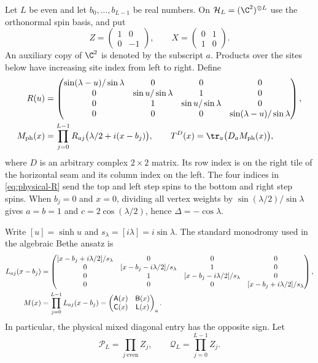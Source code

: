 Let $L$ be even and let $b_0,\ldots,b_{L-1}$ be real numbers.  On
$\mathcal H_L=(\C^2)^{\otimes L}$ use the orthonormal spin basis, and put
\[
 Z=\begin{pmatrix}1&0\\0&-1\end{pmatrix},\qquad
 X=\begin{pmatrix}0&1\\1&0\end{pmatrix}.
\]
An auxiliary copy of $\C^2$ is denoted by the subscript $a$.  Products
over the sites below have increasing site index from left to right.  Define
\begin{align}
 R(u)&=
 \begin{pmatrix}
 \sin(\lambda-u)/\sin\lambda&0&0&0\\
 0&\sin u/\sin\lambda&1&0\\
 0&1&\sin u/\sin\lambda&0\\
 0&0&0&\sin(\lambda-u)/\sin\lambda
 \end{pmatrix},\label{eq:physical-R}\\
 M_{\rm ph}(x)&=\prod_{j=0}^{L-1}
 R_{aj}\bigl(\lambda/2+i(x-b_j)\bigr),\qquad
 T^D(x)=\tr_a\bigl(D_aM_{\rm ph}(x)\bigr),\label{eq:physical-row}
\end{align}
where $D$ is an arbitrary complex $2\times2$ matrix.  Its row index is
on the right tile of the horizontal seam and its column index on the
left.  The four indices in \eqref{eq:physical-R} send the top and left
step spins to the bottom and right step spins.  When $b_j=0$ and $x=0$,
dividing all vertex weights by $\sin(\lambda/2)/\sin\lambda$ gives
$a=b=1$ and $c=2\cos(\lambda/2)$, hence $\Delta=-\cos\lambda$.

Write $[u]=\sinh u$ and $s_\lambda=[i\lambda]=i\sin\lambda$.
The standard monodromy used in the algebraic Bethe ansatz is
\begin{align}
 L_{aj}(x-b_j)&=
 \begin{pmatrix}
 [x-b_j+i\lambda/2]/s_\lambda&0&0&0\\
 0&[x-b_j-i\lambda/2]/s_\lambda&1&0\\
 0&1&[x-b_j-i\lambda/2]/s_\lambda&0\\
 0&0&0&[x-b_j+i\lambda/2]/s_\lambda
 \end{pmatrix},\notag\\
 M(x)&=\prod_{j=0}^{L-1}L_{aj}(x-b_j)
      =\begin{pmatrix}\mathsf A(x)&\mathsf B(x)\\
                         \mathsf C(x)&\mathsf L(x)\end{pmatrix}_a.
 \label{eq:standard-monodromy}
\end{align}
In particular, the physical mixed diagonal entry has the opposite sign.
Let
\begin{equation}\label{eq:parity-gauges}
 \mathcal P_L=\prod_{j\ {\mathrm{even}}}Z_j,
 \qquad \mathcal Q_L=\prod_{j=0}^{L-1}Z_j.
\end{equation}

